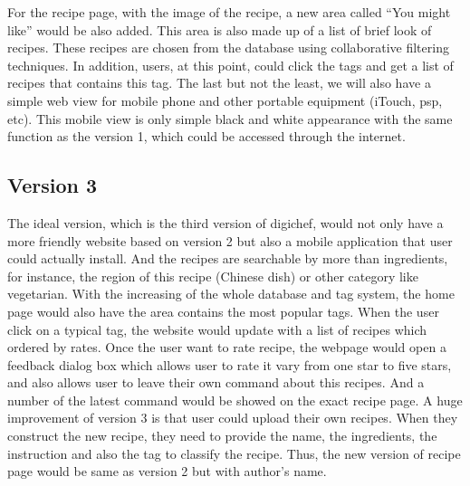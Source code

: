 For the recipe page, with the image of the recipe, a new area called “You might like” would be also added.  This area is also made up of a list of brief look of recipes. These recipes are chosen from the database using collaborative filtering techniques. In addition, users, at this point, could click the tags and get a list of recipes that contains this tag.
The last but not the least, we will also have a simple web view for mobile phone and other portable equipment (iTouch, psp, etc). This mobile view is only simple black and white appearance with the same function as the version 1, which could be accessed through the internet.

\subsection{Version 3}
The ideal version, which is the third version of digichef, would not only have a more friendly website based on version 2 but also a mobile application that user could actually install. And the recipes are searchable by more than ingredients, for instance, the region of this recipe (Chinese dish) or other category like vegetarian. 
With the increasing of the whole database and tag system, the home page would also have the area contains the most popular tags. When the user click on a typical tag, the website would update with a list of recipes which ordered by rates. 
Once the user want to rate recipe, the webpage would open a feedback dialog box which allows user to rate it vary from one star to five stars, and also allows user to leave their own command about this recipes. And a number of the latest command would be showed on the exact recipe page. 
A huge improvement of version 3 is that user could upload their own recipes. When they construct the new recipe, they need to provide the name, the ingredients, the instruction and also the tag to classify the recipe. Thus, the new version of recipe page would be same as version 2 but with author’s name. 

